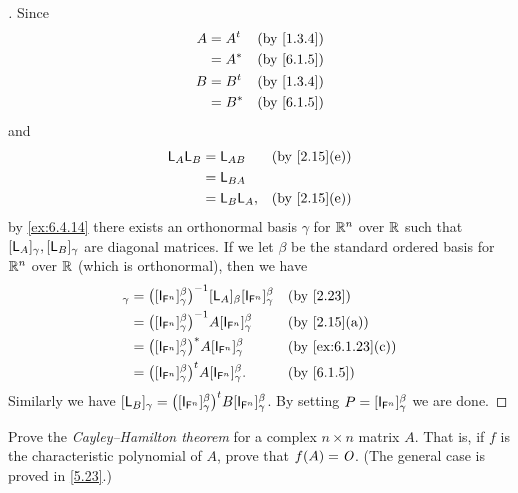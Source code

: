 \begin{proof}[]
  Since
  \begin{align*}
    A & = \tp{A} &  & \by{1.3.4} \\
      & = A^*    &  & \by{6.1.5} \\
    B & = \tp{B} &  & \by{1.3.4} \\
      & = B^*    &  & \by{6.1.5}
  \end{align*}
  and
  \begin{align*}
    \L_A \L_B & = \L_{AB}    &  & \by{2.15}[e] \\
              & = \L_{BA}                      \\
              & = \L_B \L_A, &  & \by{2.15}[e]
  \end{align*}
  by \cref{ex:6.4.14} there exists an orthonormal basis \(\gamma\) for \(\mathbb{R}^n\) over \(\mathbb{R}\) such that \([\mathsf{L}_A]_{\gamma}, [\mathsf{L}_B]_{\gamma}\) are diagonal matrices.
  If we let \(\beta\) be the standard ordered basis for \(\mathbb{R}^n\) over \(\mathbb{R}\) (which is orthonormal), then we have
  \begin{align*}
    [\L_A]_{\gamma} & = \pa{[\IT[\vs{F}^n]]_{\gamma}^{\beta}}^{-1} [\L_A]_{\beta} [\IT[\vs{F}^n]]_{\gamma}^{\beta} &  & \by{2.23}         \\
                    & = \pa{[\IT[\vs{F}^n]]_{\gamma}^{\beta}}^{-1} A [\IT[\vs{F}^n]]_{\gamma}^{\beta}              &  & \by{2.15}[a]      \\
                    & = \pa{[\IT[\vs{F}^n]]_{\gamma}^{\beta}}^* A [\IT[\vs{F}^n]]_{\gamma}^{\beta}                 &  & \by{ex:6.1.23}[c] \\
                    & = \tp{\pa{[\IT[\vs{F}^n]]_{\gamma}^{\beta}}} A [\IT[\vs{F}^n]]_{\gamma}^{\beta}.             &  & \by{6.1.5}
  \end{align*}
  Similarly we have \([\L_B]_{\gamma} = \tp{\pa{[\IT[\vs{F}^n]]_{\gamma}^{\beta}}} B [\IT[\vs{F}^n]]_{\gamma}^{\beta}\).
  By setting \(P = [\IT[\vs{F}^n]]_{\gamma}^{\beta}\) we are done.
\end{proof}

\begin{ex}\label{ex:6.4.16}
  Prove the \emph{Cayley--Hamilton theorem} for a complex \(n \times n\) matrix \(A\).
  That is, if \(f\) is the characteristic polynomial of \(A\), prove that \(f(A) = \mathit{O}\).
  (The general case is proved in \cref{5.23}.)
\end{ex}

